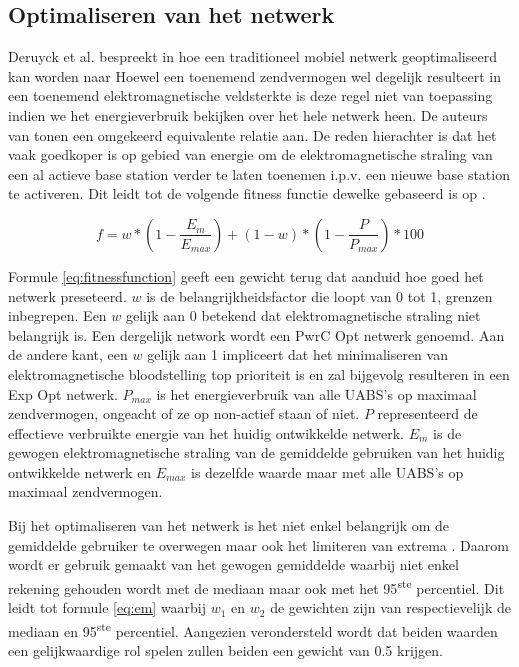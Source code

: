 \documentclass[twocolumn]{phdsymp} %
\begin{document}
\subsection{Optimaliseren van het netwerk}

Deruyck et al. bespreekt in \cite{J1} hoe een traditioneel mobiel netwerk geoptimaliseerd kan worden naar
Hoewel een toenemend zendvermogen wel degelijk resulteert in een toenemend elektromagnetische veldsterkte is deze regel niet van 
toepassing indien we het energieverbruik bekijken over het hele netwerk heen. 
De auteurs van \cite{J1} tonen een omgekeerd equivalente relatie aan.
De reden hierachter is dat het vaak goedkoper is op gebied van energie om de elektromagnetische straling van een al actieve base station 
verder te laten toenemen i.p.v.  een nieuwe base station te activeren. Dit leidt tot de volgende fitness functie dewelke
gebaseerd is op \cite{J1}.

\begin{equation} 
f = w * \left(1 - \frac{E_m}{E_{max}}\right) + (1 - w)*\left(1 - \frac{P}{P_{max}}\right) * 100
\label{eq:fitnessfunction}
\end{equation}

Formule \ref{eq:fitnessfunction} geeft een gewicht terug dat aanduid hoe goed het netwerk preseteerd.
$w$ is de belangrijkheidsfactor die loopt van 0 tot 1, grenzen inbegrepen. Een $w$ gelijk aan 0 betekend
dat elektromagnetische straling niet belangrijk is. Een dergelijk network wordt een \gls{PwrC Opt} netwerk genoemd.
Aan de andere kant, een $w$ gelijk aan 1 impliceert dat het minimaliseren van elektromagnetische bloodstelling top prioriteit is
en zal bijgevolg resulteren in een \gls{Exp Opt} netwerk. $P_{max}$ is het energieverbruik van alle \gls{UABS}'s op maximaal 
zendvermogen, ongeacht of ze 
op non-actief staan of niet.
$P$ representeerd de effectieve verbruikte energie van het huidig ontwikkelde netwerk.
$E_m$ is de gewogen elektromagnetische straling van de gemiddelde gebruiken van het huidig ontwikkelde netwerk en 
$E_{max}$ is dezelfde waarde maar met alle \gls{UABS}'s op maximaal zendvermogen.

Bij het optimaliseren van het netwerk is het niet enkel belangrijk om  de gemiddelde gebruiker te overwegen maar ook het limiteren 
van extrema \cite{J1}. 
Daarom wordt er gebruik gemaakt van het gewogen gemiddelde waarbij niet enkel rekening gehouden wordt met de mediaan maar ook 
met het 95\textsuperscript{ste} percentiel. Dit leidt tot formule \ref{eq:em} waarbij 
  $w_1$ en  $w_2$ de gewichten zijn van respectievelijk de mediaan en 95\textsuperscript{ste} percentiel.
 Aangezien verondersteld wordt dat beiden waarden een gelijkwaardige rol spelen zullen beiden een gewicht van 0.5 krijgen. 
\end{document}
